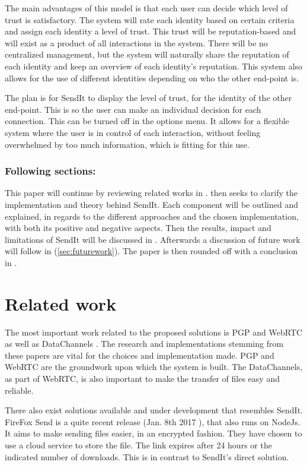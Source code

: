 \documentclass[runningheads]{llncs}
\begin{document}
The main advantages of this model is that each user can decide which level of trust is satisfactory. The system will rate each identity based on certain criteria and assign each identity a level of trust. This trust will be reputation-based and will exist as a product of all interactions in the system. There will be no centralized management, but the system will naturally share the reputation of each identity and keep an overview of each identity's reputation. This system also allows for the use of different identities depending on who the other end-point is.

The plan is for SendIt to display the level of trust, for the identity of the other end-point. This is so the user can make an individual decision for each connection. This can be turned off in the options menu. It allows for a flexible system where the user is in control of each interaction, without feeling overwhelmed by too much information, which is fitting for this use.
%
\subsubsection{Following sections:}
This paper will continue by reviewing related works in .  then seeks to clarify the implementation and theory behind SendIt. Each component will be outlined and explained, in regards to the different approaches and the chosen implementation, with both its positive and negative aspects. Then the results, impact and limitations of SendIt will be discussed in . Afterwards  a discussion of future work will follow in (\cref{sec:futurework}). The paper is then rounded off with a conclusion in .
%
\section{Related work}
\label{sec:relatedwork}
%
The most important work related to the proposed solutions is PGP \cite{ar_pgp} and WebRTC \cite{ar_webrtc} as well as DataChannels \cite{ar_webrtc_dc,url_webrtc_data}.
The research and implementations stemming from these papers are vital for the choices and implementation made. PGP and WebRTC are the groundwork upon which the system is built. The DataChannels, as part of WebRTC, is also important to make the transfer of files easy and reliable.

There also exist solutions available and under development that resembles SendIt. FireFox Send\cite{url_firesend} is a quite recent release (Jan. 8th 2017 ), that also runs on NodeJs. It aims to make sending files easier, in an encrypted fashion. They have chosen to use a cloud service to store the file. The link expires after 24 hours or the indicated number of downloads. This is in contrast to SendIt's direct solution.
\end{document}
